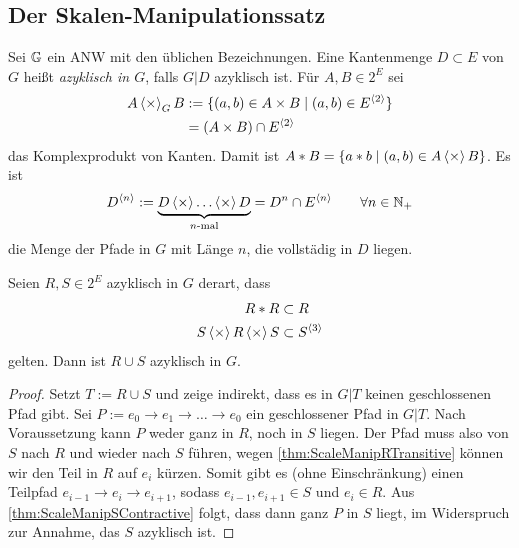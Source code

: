 \subsection{Der Skalen-Manipulationssatz}

\begin{definition}
    Sei $\mathbb{G}$ ein ANW mit den üblichen Bezeichnungen.
    Eine Kantenmenge $D\subset E$ von $G$ heißt \emph{azyklisch in $G$}, falls $G|D$ azyklisch ist.
    Für $A,B\in 2^E$ sei
    \begin{align}
        A\operatorname{\langle\times\rangle}_G B
            &:= \{(a, b)\in A\times B \mid (a, b)\in E^{\langle2\rangle}\} \\
            &= (A\times B) \cap E^{\langle2\rangle} \nonumber
    \end{align}
    das Komplexprodukt von Kanten.
    Damit ist $A*B = \{a*b\mid (a, b)\in A\operatorname{\langle\times\rangle} B\}$.
    Es ist
    \[
        D^{\langle n\rangle}
            := \underbrace{D\operatorname{\langle\times\rangle} \ldots\operatorname{\langle\times\rangle} D}_{n\text{-mal}}
            = D^n \cap E^{\langle n\rangle}
            \qquad \forall n\in\mathbb{N}_{+}
    \]
    die Menge der Pfade in $G$ mit Länge $n$, die vollstädig in $D$ liegen.
\end{definition}

\begin{satz}
    Seien $R, S\in 2^E$ azyklisch in $G$ derart, dass
    \begin{align}
        R*R &\subset R \label{thm:ScaleManipRTransitive}\\
        S\operatorname{\langle\times\rangle} R\operatorname{\langle\times\rangle} S &\subset S^{\langle3\rangle} \label{thm:ScaleManipSContractive}
    \end{align}
    gelten.
    Dann ist $R\cup S$ azyklisch in $G$.
    \begin{proof}
        Setzt $T := R\cup S$ und zeige indirekt, dass es in $G|T$ keinen geschlossenen Pfad gibt.
        Sei $P := e_0\to e_1 \to \ldots \to e_0$ ein geschlossener Pfad in $G|T$.
        Nach Voraussetzung kann $P$ weder ganz in $R$, noch in $S$ liegen.
        Der Pfad muss also von $S$ nach $R$ und wieder nach $S$ führen, wegen
        \eqref{thm:ScaleManipRTransitive} können wir den Teil in $R$ auf $e_i$ kürzen.
        Somit gibt es (ohne Einschränkung) einen Teilpfad $e_{i-1} \to e_i \to e_{i+1}$, sodass $e_{i-1}, e_{i+1}\in S$ und $e_i\in R$.
        Aus \eqref{thm:ScaleManipSContractive} folgt, dass dann ganz $P$ in $S$
        liegt, im Widerspruch zur Annahme, das $S$ azyklisch ist.
    \end{proof}
\end{satz}

